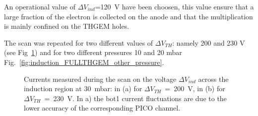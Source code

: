 \documentclass[a4paper, 11 pt]{report}
\newcommand{\Vind}{$\Delta V_{ind}$}
\newcommand{\Vthgem}{$\Delta V_{TH}$}
\begin{document}
An operational value of \Vind{}=120~V have been choosen, this value ensure that a large fraction of 
the electron is collected on the anode and that the multiplication is mainly confined on the THGEM 
holes.

The scan was repeated for two different values of \Vthgem{}: namely 200 and 230 V (see 
Fig~\ref{fig:induction_FULLTHGEM_30mbar_other_VTHGEM}) and for two different pressures 10 and 20 
mbar Fig.~\ref{fig:induction_FULLTHGEM_other_pressure}.

\begin{figure}[!htb]
	\centering
	\caption{Currents measured during the scan on the voltage \Vind{} across the induction region at 
	  30~mbar: in (a) for \Vthgem~=~200~V, in (b) for \Vthgem~=~230~V. In a) the bot1 current 
	  fluctuations are due to the lower accuracy of the corresponding PICO channel.}
	\label{fig:induction_FULLTHGEM_30mbar_other_VTHGEM}
\end{figure}
\end{document}
